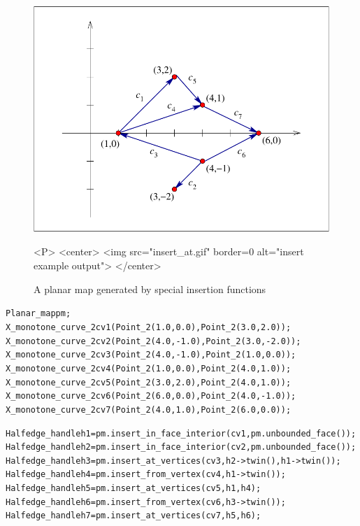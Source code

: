 \begin{figure}[h]
\begin{ccTexOnly}
\centerline{\includegraphics{Planar_map/insert_at}}
\end{ccTexOnly}

\caption{A planar map generated by special insertion functions
\label{PM_sec:insert_at}}

\begin{ccHtmlOnly}
<P>
<center>
  <img src="insert_at.gif"  border=0 alt="insert example output">
</center>
\end{ccHtmlOnly}
\end{figure}

\begin{alltt}
  Planar_map pm;
  X_monotone_curve_2 cv1(Point_2(1.0, 0.0), Point_2(3.0, 2.0));
  X_monotone_curve_2 cv2(Point_2(4.0, -1.0), Point_2(3.0, -2.0));
  X_monotone_curve_2 cv3(Point_2(4.0, -1.0), Point_2(1.0, 0.0));
  X_monotone_curve_2 cv4(Point_2(1.0, 0.0), Point_2(4.0, 1.0));
  X_monotone_curve_2 cv5(Point_2(3.0, 2.0), Point_2(4.0, 1.0));
  X_monotone_curve_2 cv6(Point_2(6.0, 0.0), Point_2(4.0, -1.0));
  X_monotone_curve_2 cv7(Point_2(4.0, 1.0), Point_2(6.0, 0.0));

  Halfedge_handle h1 = pm.insert_in_face_interior(cv1, pm.unbounded_face());
  Halfedge_handle h2 = pm.insert_in_face_interior(cv2, pm.unbounded_face());
  Halfedge_handle h3 = pm.insert_at_vertices(cv3, h2->twin(), h1->twin());
  Halfedge_handle h4 = pm.insert_from_vertex(cv4, h1->twin());
  Halfedge_handle h5 = pm.insert_at_vertices(cv5, h1, h4);
  Halfedge_handle h6 = pm.insert_from_vertex(cv6, h3->twin());
  Halfedge_handle h7 = pm.insert_at_vertices(cv7, h5, h6);
\end{alltt}

